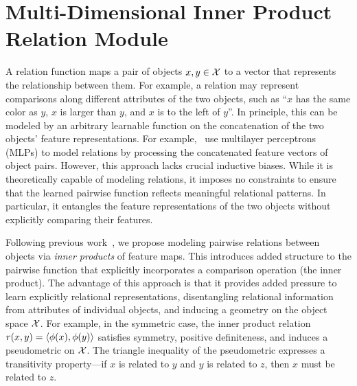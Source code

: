 \section{Multi-Dimensional Inner Product Relation Module}\label{sec:mdipr}

A relation function maps a pair of objects $x, y \in {\mathcal{X}}$ to a vector that represents the relationship between them. For example, a relation may represent comparisons along different attributes of the two objects, such as ``$x$ has the same color as $y$, $x$ is larger than $y$, and $x$ is to the left of $y$''. In principle, this can be modeled by an arbitrary learnable function on the concatenation of the two objects' feature representations. For example,~\citet{santoroSimpleNeural2017} use multilayer perceptrons (MLPs) to model relations by processing the concatenated feature vectors of object pairs. However, this approach lacks crucial inductive biases. While it is theoretically capable of modeling relations,  it imposes no constraints to ensure that the learned pairwise function reflects meaningful relational patterns. In particular, it entangles the feature representations of the two objects without explicitly comparing their features.

Following previous work~\citep[e.g.,][]{vaswani2017attention, webbEmergentSymbols2021, kergNeuralArchitecture2022, altabaaAbstractorsRelationalCrossattention2024}, we propose modeling pairwise relations between objects via \textit{inner products} of feature maps. This introduces added structure to the pairwise function that explicitly incorporates a comparison operation (the inner product).
The advantage of this approach is that it provides added pressure to learn explicitly relational representations, disentangling relational information from attributes of individual objects, and inducing a geometry on the object space ${\mathcal{X}}$.
For example, in the symmetric case, the inner product relation $r(x,y) = \left \langle \phi(x), \phi(y) \right\rangle$ satisfies symmetry, positive definiteness, and induces a pseudometric on ${\mathcal{X}}$. The triangle inequality of the pseudometric expresses a transitivity property---if $x$ is related to $y$ and $y$ is related to $z$, then $x$ must be related to $z$.

